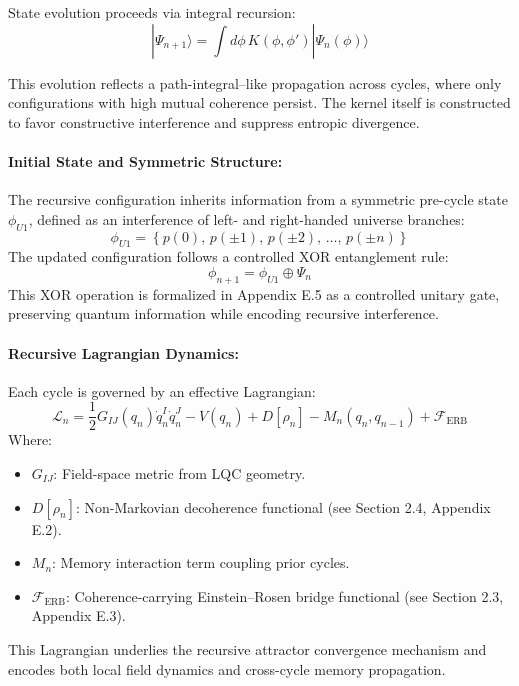 State evolution proceeds via integral recursion:
\begin{equation}
|\Psi_{n+1}\rangle = \int d\phi \, K(\phi, \phi') |\Psi_n(\phi)\rangle
\end{equation}

This evolution reflects a path-integral–like propagation across cycles, where only configurations with high mutual coherence persist. The kernel itself is constructed to favor constructive interference and suppress entropic divergence.

\paragraph{Initial State and Symmetric Structure:}

The recursive configuration inherits information from a symmetric pre-cycle state \( \phi_{U1} \), defined as an interference of left- and right-handed universe branches:
\[
\phi_{U1} = \left\{ p(0),\, p(\pm1),\, p(\pm2),\, \ldots,\, p(\pm n) \right\}
\]
The updated configuration follows a controlled XOR entanglement rule:
\[
\phi_{n+1} = \phi_{U1} \oplus \Psi_n
\]
This XOR operation is formalized in Appendix E.5 as a controlled unitary gate, preserving quantum information while encoding recursive interference.

\paragraph{Recursive Lagrangian Dynamics:}

Each cycle is governed by an effective Lagrangian:
\begin{equation}
\mathcal{L}_n = \frac{1}{2} G_{IJ}(q_n) \dot{q}_n^I \dot{q}_n^J - V(q_n) + D[\rho_n] - M_n(q_n, q_{n-1}) + \mathcal{F}_{\text{ERB}}
\end{equation}
Where:
\begin{itemize}
  \item \( G_{IJ} \): Field-space metric from LQC geometry.
  \item \( D[\rho_n] \): Non-Markovian decoherence functional (see Section 2.4, Appendix E.2).
  \item \( M_n \): Memory interaction term coupling prior cycles.
  \item \( \mathcal{F}_{\text{ERB}} \): Coherence-carrying Einstein–Rosen bridge functional (see Section 2.3, Appendix E.3).
\end{itemize}

This Lagrangian underlies the recursive attractor convergence mechanism and encodes both local field dynamics and cross-cycle memory propagation.

